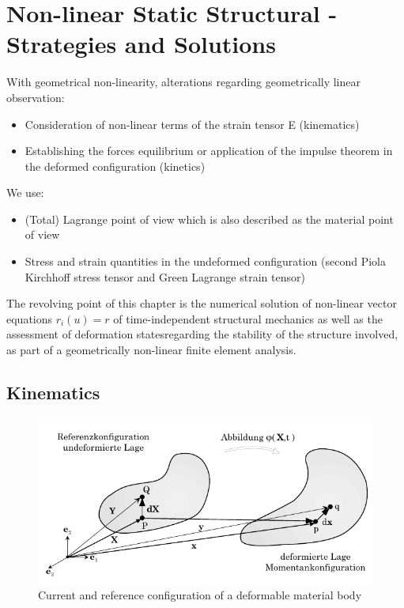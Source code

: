 \chapter{Non-linear Static Structural - Strategies and Solutions} %

\label{Chapter2 } %
\label{sec:nonlinear}
\vspace{0.38cm}
\newline
With geometrical non-linearity, alterations regarding geometrically linear observation:
\begin{itemize}
    \item Consideration of non-linear terms of the strain tensor E (kinematics)
     \item Establishing the forces equilibrium or application of the impulse theorem in the deformed
configuration (kinetics)

\end{itemize}
We use: 


\begin{itemize}
    \item  (Total) Lagrange point of view which is also described as the material point of view
     \item Stress and strain quantities in the undeformed configuration (second Piola Kirchhoff
stress tensor and Green Lagrange strain tensor)

\end{itemize}

The revolving point of this chapter is the numerical solution of non-linear vector equations $r_i(u)=r$ of time-independent structural mechanics as well as the assessment of deformation statesregarding the stability of the structure involved, as part of a geometrically non-linear finite
element analysis.
\newpage


\section{Kinematics}
\begin{figure}[h]
    \centering
    \includegraphics[scale=0.5]{Figures/Chapter2/anh3.png}
    \decoRule   
    \caption{ Current and reference configuration of a deformable material body}
    \label{fig:chap2anh3}
\end{figure}


